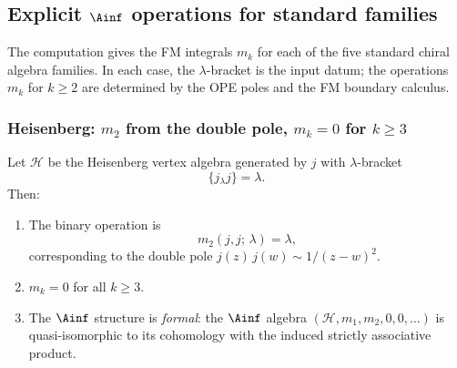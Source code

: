 \subsection{Explicit $\Ainf$ operations for standard families}

The computation gives the FM integrals $m_k$ for each of the five
standard chiral algebra families. In each case, the
$\lambda$-bracket is the input datum; the operations
$m_k$ for $k \ge 2$ are determined by the OPE poles and
the FM boundary calculus.

\subsubsection{Heisenberg: $m_2$ from the double pole,
$m_k = 0$ for $k \ge 3$}

\begin{theorem}
Let $\mathcal{H}$ be the Heisenberg vertex algebra generated
by $j$ with $\lambda$-bracket
\begin{equation}%
\{j{}_\lambda j\} = \lambda.
\end{equation}
Then:
\begin{enumerate}[label=\textup{(\roman*)}]
\item The binary operation is
\begin{equation}%
m_2(j, j;\, \lambda) = \lambda,
\end{equation}
corresponding to the double pole
$j(z)\, j(w) \sim 1/(z-w)^2$.
\item $m_k = 0$ for all $k \ge 3$.
\item The $\Ainf$ structure is \emph{formal}: the
 $\Ainf$ algebra $(\mathcal{H}, m_1, m_2, 0, 0, \ldots)$
 is quasi-isomorphic to its cohomology with the induced
 strictly associative product.
\end{enumerate}
\end{theorem}

